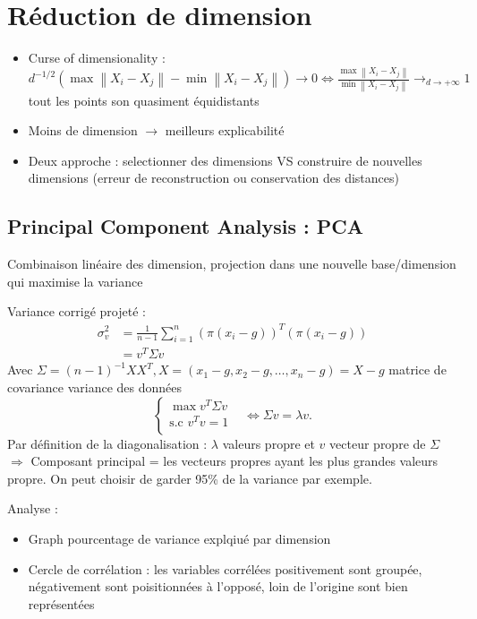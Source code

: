 \documentclass{article}
\begin{document}
\section{Réduction de dimension}
\begin{itemize}
    \item Curse of dimensionality : $ d^{-1/2} (\max \left\| X_i - X_j \right\| - \min \left\| X_i - X_j \right\| ) \to 0 \Leftrightarrow \frac{\max \left\| X_i - X_j \right\| }{\min \left\| X_i - X_j \right\| } \to_{d \to + \infty } 1 $ tout les points son quasiment équidistants  
    \item Moins de dimension $\rightarrow$ meilleurs explicabilité
    \item Deux approche : selectionner des dimensions VS construire de nouvelles dimensions (erreur de reconstruction ou conservation des distances)
\end{itemize}

\subsection{Principal Component Analysis : PCA}
Combinaison linéaire des dimension, projection dans une nouvelle base/dimension qui maximise la variance

Variance corrigé projeté : \begin{align*}
    \sigma _v^2 &= \frac{1}{n-1}\sum_{i=1}^{n}(\pi (x_i - g))^T (\pi (x_i - g)) \\
    &= v^T \Sigma v
\end{align*}
Avec $ \Sigma = (n-1)^{-1} X X^T, X = (x_1 - g, x_2 - g, \dots, x_n - g) = X - g$ matrice de covariance variance des données
\[
    \begin{cases}
    \max v^T \Sigma v &\text{}\\
    \text{s.c } v^T v = 1\\
    \end{cases} \Leftrightarrow \Sigma v = \lambda v
.\]
Par définition de la diagonalisation : $ \lambda $ valeurs propre et $ v $ vecteur propre de $ \Sigma  $ \\
$\Rightarrow $ Composant principal = les vecteurs propres ayant les plus grandes valeurs propre. On peut choisir de garder 95\% de la variance par exemple.

Analyse : \begin{itemize}
    \item Graph pourcentage de variance explqiué par dimension
    \item Cercle de corrélation : les variables corrélées positivement sont groupée, négativement sont poisitionnées à l'opposé, loin de l'origine sont bien représentées
\end{itemize}
\end{document}
